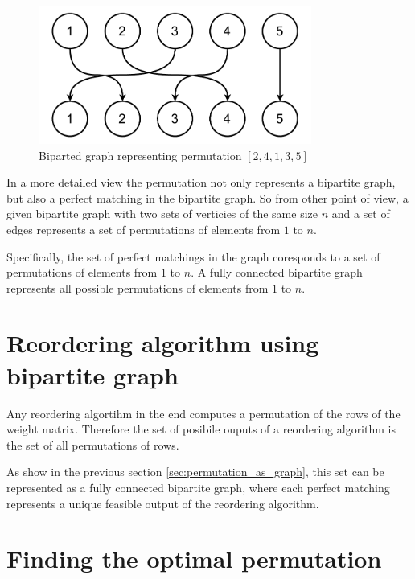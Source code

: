 \begin{figure}[h]
    \centerline{\includegraphics[width=0.8\textwidth]{images/permutation_graph}}
    \caption[Biparted graph representing permutation]{Biparted graph representing permutation $[2, 4, 1, 3, 5]$}
    \label{fig:permuatation_graph}
\end{figure}

In a more detailed view the permutation not only represents a bipartite graph, but also a perfect matching in the bipartite graph. So from other point of view, a given bipartite graph with two sets of verticies of the same size $n$ and a set of edges represents a set of permutations of elements from $1$ to $n$.

Specifically, the set of perfect matchings in the graph coresponds to a set of permutations of elements from $1$ to $n$. A fully connected bipartite graph represents all possible permutations of elements from $1$ to $n$.

\section{Reordering algorithm using bipartite graph}

Any reordering algortihm in the end computes a permutation of the rows of the weight matrix. Therefore the set of posibile ouputs of a reordering algorithm is the set of all permutations of rows.

As show in the previous section \ref{sec:permutation_as_graph}, this set can be represented as a fully connected bipartite graph, where each perfect matching represents a unique feasible output of the reordering algorithm.

\section{Finding the optimal permutation}

